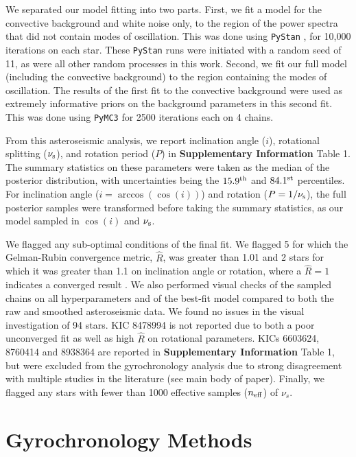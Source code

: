 We separated our model fitting into two parts. First, we fit a model for the convective background and white noise only, to the region of the power spectra that did not contain modes of oscillation. This was done using \texttt{PyStan} \cite{m_vanhoey+2013, m_carpenter+2017}, for 10,000 iterations on each star. These \texttt{PyStan} runs were initiated with a random seed of 11, as were all other random processes in this work. Second, we fit our full model (including the convective background) to the region containing the modes of oscillation. The results of the first fit to the convective background were used as extremely informative priors on the background parameters in this second fit. This was done using \texttt{PyMC3} \cite{m_vanderwalt+2011,m_salvatier+2016, m_thetheanodevelopmentteam+2016} for 2500 iterations each on 4 chains.

From this asteroseismic analysis, we report inclination angle ($i$), rotational splitting ($\nu_{\rm s}$), and rotation period ($P$) in \textbf{Supplementary Information} Table 1. The summary statistics on these parameters were taken as the median of the posterior distribution, with uncertainties being the $15.9^{\rm th}$ and $84.1^{\rm st}$ percentiles. For inclination angle ($i = \arccos(\cos(i))$) and rotation ($P = 1/\nu_{\rm s}$), the full posterior samples were transformed before taking the summary statistics, as our model sampled in $\cos(i)$ and $\nu_{\rm s}$.

We flagged any sub-optimal conditions of the final fit. We flagged 5 for which the Gelman-Rubin convergence metric, $\hat{R}$, was greater than 1.01 and 2 stars for which it was greater than 1.1 on inclination angle or rotation, where a $\hat{R} = 1$ indicates a converged result \cite{m_gelman+rubin1992}. We also performed visual checks of the sampled chains on all hyperparameters and of the best-fit model compared to both the raw and smoothed asteroseismic data. We found no issues in the visual investigation of 94 stars. KIC 8478994 is not reported due to both a poor unconverged fit as well as high $\hat{R}$ on rotational parameters. KICs 6603624, 8760414 and 8938364 are reported in  \textbf{Supplementary Information} Table 1, but were excluded from the gyrochronology analysis due to strong disagreement with multiple studies in the literature (see main body of paper). Finally, we flagged any stars with fewer than 1000 effective samples ($n_{\rm eff}$) of $\nu_s$.


\section{Gyrochronology Methods}\label{s:gyro}
